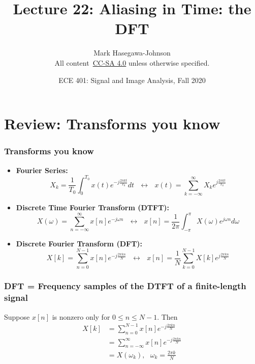 \documentclass{beamer}
\title{Lecture 22: Aliasing in Time: the DFT}
\author{Mark Hasegawa-Johnson\\All content~\href{https://creativecommons.org/licenses/by-sa/4.0/}{CC-SA 4.0} unless otherwise specified.}
\date{ECE 401: Signal and Image Analysis, Fall 2020}
\begin{document}
\begin{frame}
  \maketitle
\end{frame}

\begin{frame}
  \tableofcontents
\end{frame}

\section[Review]{Review: Transforms you know}
\setcounter{subsection}{1}

\begin{frame}
  \frametitle{Transforms you know}
  \begin{itemize}
  \item {\bf Fourier Series:}
    \begin{displaymath}
      X_k=\frac{1}{T_0}\int_0^{T_0}x(t)e^{-j\frac{2\pi kt}{T_0}}dt~~~\leftrightarrow~~~
      x(t)=\sum_{k=-\infty}^\infty X_ke^{j\frac{2\pi kt}{T_0}}
    \end{displaymath}
  \item {\bf Discrete Time Fourier Transform (DTFT):}
    \begin{displaymath}
      X(\omega)=\sum_{n=-\infty}^\infty x[n]e^{-j\omega n}~~~\leftrightarrow~~~
      x[n]=\frac{1}{2\pi}\int_{-\pi}^\pi X(\omega)e^{j\omega n}d\omega
    \end{displaymath}
  \item {\bf Discrete Fourier Transform (DFT):}
    \begin{displaymath}
      X[k]=\sum_{n=0}^{N-1} x[n]e^{-j\frac{2\pi kn}{N}}~~~\leftrightarrow~~~
      x[n]=\frac{1}{N}\sum_{k=0}^{N-1}X[k]e^{j\frac{2\pi kn}{N}}
    \end{displaymath}
  \end{itemize}
\end{frame}

\begin{frame}
  \frametitle{DFT = Frequency samples of the DTFT of a finite-length signal}

  Suppose $x[n]$ is nonzero only for $0\le n\le N-1$.  Then
  \begin{align*}
    X[k] &=\sum_{n=0}^{N-1} x[n]e^{-j\frac{2\pi kn}{N}}\\
    &=\sum_{n=-\infty}^{\infty} x[n]e^{-j\frac{2\pi kn}{N}}\\
    &=X(\omega_k),~~~\omega_k=\frac{2\pi k}{N}
  \end{align*}
\end{frame}
\end{document}
